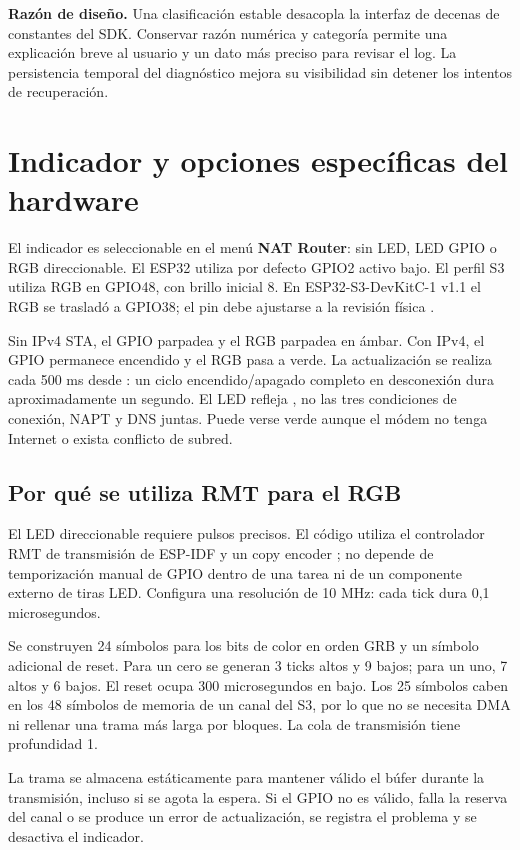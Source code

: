 \documentclass[11pt,a4paper]{article}
\newcommand{\code}[1]{\texttt{\detokenize{#1}}}
\newcommand{\decision}[1]{\par\textbf{Razón de diseño.} #1\par}
\begin{document}
\decision{Una clasificación estable desacopla la interfaz de decenas de
constantes del SDK. Conservar razón numérica y categoría permite una
explicación breve al usuario y un dato más preciso para revisar el log.
La persistencia temporal del diagnóstico mejora su visibilidad sin
detener los intentos de recuperación.}

\section{Indicador y opciones específicas del hardware}
\label{sec:led}

El indicador es seleccionable en el menú \textbf{NAT Router}: sin LED,
LED GPIO o RGB direccionable. El ESP32 utiliza por defecto GPIO2 activo
bajo. El perfil S3 utiliza RGB en GPIO48, con brillo inicial 8. En
ESP32-S3-DevKitC-1 v1.1 el RGB se trasladó a GPIO38; el pin debe ajustarse
a la revisión física \cite{devkit}.

Sin IPv4 STA, el GPIO parpadea y el RGB parpadea en ámbar. Con IPv4, el
GPIO permanece encendido y el RGB pasa a verde. La actualización se
realiza cada 500 ms desde \code{app_main()}: un ciclo encendido/apagado
completo en desconexión dura aproximadamente un segundo. El LED refleja
\code{router_wifi_is_connected()}, no las tres condiciones de conexión,
NAPT y DNS juntas. Puede verse verde aunque el módem no tenga Internet o
exista conflicto de subred.

\subsection{Por qué se utiliza RMT para el RGB}

El LED direccionable requiere pulsos precisos. El código utiliza el
controlador RMT de transmisión de ESP-IDF y un copy encoder
\cite{rmt}; no depende de temporización manual de GPIO dentro de una
tarea ni de un componente externo de tiras LED. Configura una resolución
de 10 MHz: cada tick dura 0,1 microsegundos.

Se construyen 24 símbolos para los bits de color en orden GRB y un símbolo
adicional de reset. Para un cero se generan 3 ticks altos y 9 bajos;
para un uno, 7 altos y 6 bajos. El reset ocupa 300 microsegundos en bajo.
Los 25 símbolos caben en los 48 símbolos de memoria de un canal del S3,
por lo que no se necesita DMA ni rellenar una trama más larga por bloques.
La cola de transmisión tiene profundidad 1.

La trama se almacena estáticamente para mantener válido el búfer durante
la transmisión, incluso si se agota la espera. Si el GPIO no es válido,
falla la reserva del canal o se produce un error de actualización, se
registra el problema y se desactiva el indicador.
\end{document}
